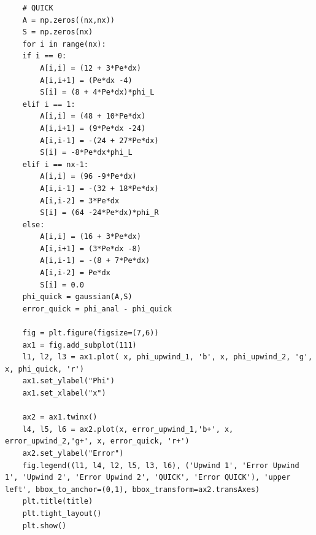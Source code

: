 \documentclass[11pt]{article}
\begin{document}
\begin{verbatim}
    # QUICK
    A = np.zeros((nx,nx))
    S = np.zeros(nx)
    for i in range(nx):
	if i == 0:
	    A[i,i] = (12 + 3*Pe*dx)
	    A[i,i+1] = (Pe*dx -4)
	    S[i] = (8 + 4*Pe*dx)*phi_L
	elif i == 1:
	    A[i,i] = (48 + 10*Pe*dx)
	    A[i,i+1] = (9*Pe*dx -24)
	    A[i,i-1] = -(24 + 27*Pe*dx)
	    S[i] = -8*Pe*dx*phi_L
	elif i == nx-1:
	    A[i,i] = (96 -9*Pe*dx)
	    A[i,i-1] = -(32 + 18*Pe*dx)
	    A[i,i-2] = 3*Pe*dx
	    S[i] = (64 -24*Pe*dx)*phi_R
	else:
	    A[i,i] = (16 + 3*Pe*dx)
	    A[i,i+1] = (3*Pe*dx -8)
	    A[i,i-1] = -(8 + 7*Pe*dx)
	    A[i,i-2] = Pe*dx
	    S[i] = 0.0
    phi_quick = gaussian(A,S)
    error_quick = phi_anal - phi_quick

    fig = plt.figure(figsize=(7,6))
    ax1 = fig.add_subplot(111)
    l1, l2, l3 = ax1.plot( x, phi_upwind_1, 'b', x, phi_upwind_2, 'g', x, phi_quick, 'r')
    ax1.set_ylabel("Phi")
    ax1.set_xlabel("x")

    ax2 = ax1.twinx()
    l4, l5, l6 = ax2.plot(x, error_upwind_1,'b+', x, error_upwind_2,'g+', x, error_quick, 'r+')
    ax2.set_ylabel("Error")
    fig.legend((l1, l4, l2, l5, l3, l6), ('Upwind 1', 'Error Upwind 1', 'Upwind 2', 'Error Upwind 2', 'QUICK', 'Error QUICK'), 'upper left', bbox_to_anchor=(0,1), bbox_transform=ax2.transAxes)
    plt.title(title)
    plt.tight_layout()
    plt.show()
\end{verbatim}
\end{document}
